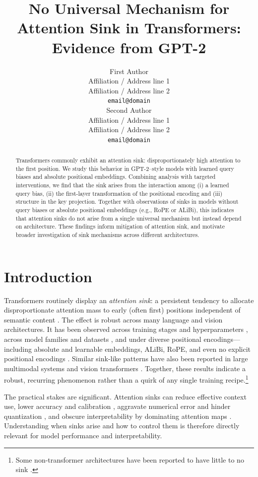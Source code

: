 \documentclass[11pt]{article}
\title{No Universal Mechanism for Attention Sink in Transformers: \\Evidence from GPT-2}
\author{First Author \\
  Affiliation / Address line 1 \\
  Affiliation / Address line 2 \\
  \texttt{email@domain} \\\And
  Second Author \\
  Affiliation / Address line 1 \\
  Affiliation / Address line 2 \\
  \texttt{email@domain} \\
}
\date{}
\begin{document}
\maketitle

\begin{abstract}
  Transformers commonly exhibit an attention sink: disproportionately high attention to the first position. We study this behavior in GPT-2–style models with learned query biases and absolute positional embeddings. Combining analysis with targeted interventions, we find that the sink arises from the interaction among (i) a learned query bias, (ii) the first-layer transformation of the positional encoding and (iii) structure in the key projection. Together with observations of sinks in models without query biases or absolute positional embeddings (e.g., RoPE or ALiBi), this indicates that attention sinks do not arise from a single universal mechanism but instead depend on architecture. These findings inform mitigation of attention sink, and motivate broader investigation of sink mechanisms across different architectures.
\end{abstract}

\section{Introduction}\label{sec:intro}

Transformers routinely display an \emph{attention sink}: a persistent tendency to allocate disproportionate attention mass to early (often first) positions independent of semantic content \citep{xiao2023efficient,gu2025when}. The effect is robust across many language and vision architectures. It has been observed across training stages and hyperparameters \citep{gu2025when,Guo2024ActiveDormantAH}, across model families and datasets \citep{xiao2023efficient}, and under diverse positional encodings—including absolute and learnable embeddings, ALiBi, RoPE, and even no explicit positional encodings \citep{press2021train,su2021roformer,Irie2019LanguageMW,gu2025when}. Similar sink-like patterns have also been reported in large multimodal systems and vision transformers \citep{Kang2025See,wang2025mirage,Feng2025EDIT:}. Together, these results indicate a robust, recurring phenomenon rather than a quirk of any single training recipe.\footnote{Some non-transformer architectures have been reported to have little to no sink \citep{endy-etal-2025-mamba}.}

The practical stakes are significant. Attention sinks can reduce effective context use, lower accuracy and calibration \citep{Yu2024Unveiling,Guo2024ActiveDormantAH}, aggravate numerical error and hinder quantization \citep{sun2024massive,lin2024duquant}, and obscure interpretability by dominating attention maps \citep{Guo2024ActiveDormantAH}. Understanding when sinks arise and how to control them is therefore directly relevant for model performance and interpretability.
\end{document}
